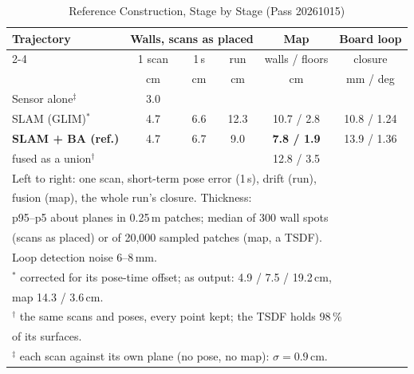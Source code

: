 \begin{table}[!t]
\centering
\caption{Reference Construction, Stage by Stage (Pass 20261015)}
\label{tab:refmap_stages}
\footnotesize
\setlength{\tabcolsep}{3pt}
\begin{tabular}{lccccc}
\toprule
Trajectory & \multicolumn{3}{c}{Walls, scans as placed} & Map & Board loop \\
\cmidrule(lr){2-4}
 & 1 scan & 1\,s & run & walls / floors & closure \\
 & cm & cm & cm & cm & mm / deg \\
\midrule
Sensor alone$^\ddagger$     & 3.0 &     &      &            &             \\
SLAM (GLIM)$^\ast$          & 4.7 & 6.6 & 12.3 & 10.7 / 2.8 & 10.8 / 1.24 \\
\textbf{SLAM + BA (ref.)}   & 4.7 & 6.7 & 9.0  & \textbf{7.8 / 1.9} & 13.9 / 1.36 \\
\quad fused as a union$^\dagger$ &  &  &  & 12.8 / 3.5 & \\
\bottomrule
\multicolumn{6}{l}{Left to right: one scan, short-term pose error (1\,s), drift (run),}\\
\multicolumn{6}{l}{fusion (map), the whole run's closure. Thickness:}\\
\multicolumn{6}{l}{p95--p5 about planes in 0.25\,m patches; median of 300 wall spots}\\
\multicolumn{6}{l}{(scans as placed) or of 20,000 sampled patches (map, a TSDF).}\\
\multicolumn{6}{l}{Loop detection noise 6--8\,mm.}\\
\multicolumn{6}{l}{$^\ast$ corrected for its pose-time offset; as output: 4.9 / 7.5 / 19.2\,cm,}\\
\multicolumn{6}{l}{\phantom{$^\ast$} map 14.3 / 3.6\,cm.}\\
\multicolumn{6}{l}{$^\dagger$ the same scans and poses, every point kept; the TSDF holds 98\,\%}\\
\multicolumn{6}{l}{\phantom{$^\dagger$} of its surfaces.}\\
\multicolumn{6}{l}{$^\ddagger$ each scan against its own plane (no pose, no map): $\sigma=0.9$\,cm.}
\end{tabular}
\end{table}
